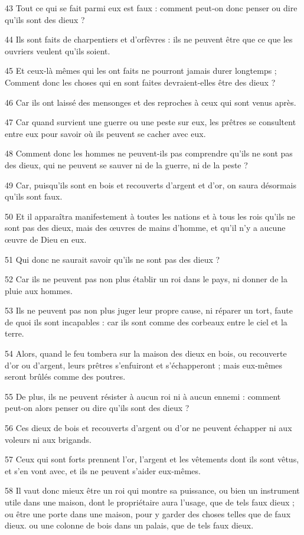 \par 43 Tout ce qui se fait parmi eux est faux : comment peut-on donc penser ou dire qu'ils sont des dieux ?
\par 44 Ils sont faits de charpentiers et d'orfèvres : ils ne peuvent être que ce que les ouvriers veulent qu'ils soient.
\par 45 Et ceux-là mêmes qui les ont faits ne pourront jamais durer longtemps ; Comment donc les choses qui en sont faites devraient-elles être des dieux ?
\par 46 Car ils ont laissé des mensonges et des reproches à ceux qui sont venus après.
\par 47 Car quand survient une guerre ou une peste sur eux, les prêtres se consultent entre eux pour savoir où ils peuvent se cacher avec eux.
\par 48 Comment donc les hommes ne peuvent-ils pas comprendre qu'ils ne sont pas des dieux, qui ne peuvent se sauver ni de la guerre, ni de la peste ?
\par 49 Car, puisqu'ils sont en bois et recouverts d'argent et d'or, on saura désormais qu'ils sont faux.
\par 50 Et il apparaîtra manifestement à toutes les nations et à tous les rois qu'ils ne sont pas des dieux, mais des œuvres de mains d'homme, et qu'il n'y a aucune œuvre de Dieu en eux.
\par 51 Qui donc ne saurait savoir qu'ils ne sont pas des dieux ?
\par 52 Car ils ne peuvent pas non plus établir un roi dans le pays, ni donner de la pluie aux hommes.
\par 53 Ils ne peuvent pas non plus juger leur propre cause, ni réparer un tort, faute de quoi ils sont incapables : car ils sont comme des corbeaux entre le ciel et la terre.
\par 54 Alors, quand le feu tombera sur la maison des dieux en bois, ou recouverte d'or ou d'argent, leurs prêtres s'enfuiront et s'échapperont ; mais eux-mêmes seront brûlés comme des poutres.
\par 55 De plus, ils ne peuvent résister à aucun roi ni à aucun ennemi : comment peut-on alors penser ou dire qu'ils sont des dieux ?
\par 56 Ces dieux de bois et recouverts d'argent ou d'or ne peuvent échapper ni aux voleurs ni aux brigands.
\par 57 Ceux qui sont forts prennent l'or, l'argent et les vêtements dont ils sont vêtus, et s'en vont avec, et ils ne peuvent s'aider eux-mêmes.
\par 58 Il vaut donc mieux être un roi qui montre sa puissance, ou bien un instrument utile dans une maison, dont le propriétaire aura l'usage, que de tels faux dieux ; ou être une porte dans une maison, pour y garder des choses telles que de faux dieux. ou une colonne de bois dans un palais, que de tels faux dieux.

